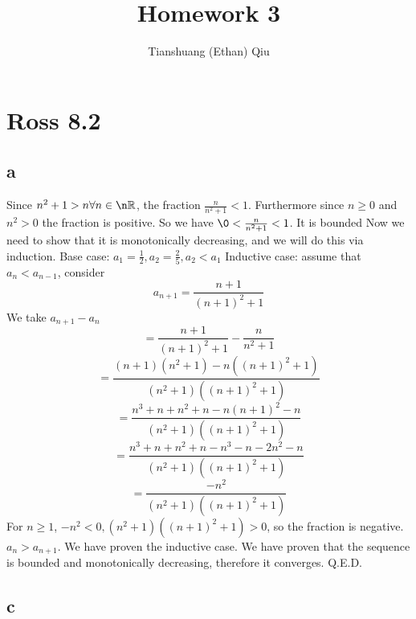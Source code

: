 \documentclass[12pt]{article}
\author{Tianshuang (Ethan) Qiu}
\newcommand{\R}{\mathbb{R}}
\begin{document}
\title{Homework 3}
\maketitle
\newpage

\section{Ross 8.2}

\subsection{a}
Since $n^2+1 > n \forall n \in \n \R$, the fraction  $\frac{n}{n^2+1} < 1$. Furthermore since $n \geq 0$ and $n^2 > 0$ the fraction is positive. So we have $\0<\frac{n}{n^2+1} < 1$. It is bounded
\newline
Now we need to show that it is monotonically decreasing, and we will do this via induction.
\newline
Base case: $a_1 = \frac{1}{2}, a_2 = \frac{2}{5}, a_2 < a_1$
\newline
Inductive case: assume that $a_n < a_{n-1}$, consider $$a_{n+1} = \frac{n+1}{(n+1)^2+1}$$
We take $a_{n+1} - a_n$
$$ = \frac{n+1}{(n+1)^2+1} - \frac{n}{n^2+1}$$
$$ = \frac{(n+1)(n^2+1)-n((n+1)^2+1)}{(n^2+1)((n+1)^2+1)}$$
$$ = \frac{n^3+n+n^2+n-n(n+1)^2-n}{(n^2+1)((n+1)^2+1)}$$
$$ = \frac{n^3+n+n^2+n-n^3-n-2n^2-n}{(n^2+1)((n+1)^2+1)}$$
$$ = \frac{-n^2}{(n^2+1)((n+1)^2+1)}$$
For $n \geq 1$, $-n^2 < 0, (n^2+1)((n+1)^2+1) > 0$, so the fraction is negative. $a_n > a_{n+1}$. We have proven the inductive case.
\newline
We have proven that the sequence is bounded and monotonically decreasing, therefore it converges. Q.E.D.


\subsection{c}
\end{document}

